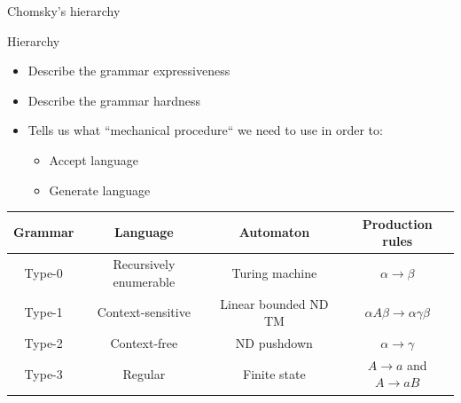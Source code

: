 \documentclass{beamer}
\begin{document}
\begin{frame}{Chomsky's hierarchy}

\begin{block}{Hierarchy}
\begin{itemize}
\item Describe the grammar expressiveness
\item Describe the grammar hardness
\item Tells us what ``mechanical procedure`` we need to use in order to:
\begin{itemize}
\item Accept language
\item Generate language
\end{itemize}
\end{itemize}
\end{block}
\vskip -0.5cm
\begin{table}\footnotesize
\begin{tabular}{c|c|c|c}
\textbf{Grammar} & \textbf{Language} & \textbf{Automaton} & \textbf{Production rules} \\
\hline
Type-0 & Recursively enumerable & Turing machine &  $\alpha \rightarrow \beta$ \\ %
Type-1 & Context-sensitive & Linear bounded ND TM &$\alpha A\beta \rightarrow \alpha \gamma \beta$ \\ 
Type-2 & Context-free & ND pushdown & $\alpha \rightarrow \gamma$ \\ 
Type-3 & Regular & Finite state &$A\rightarrow a$ and $A\rightarrow aB$ 
\end{tabular}
\end{table}


\end{frame}
\end{document}
